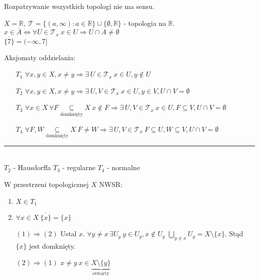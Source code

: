 \vspace{1cm}
Rozpatrywanie wszystkich topologi nie ma sensu.
\begin{prz} 
    $X = \mathbb R, \ \mathcal T = \{ (a,\infty): a \in \mathbb R \} \cup \{\emptyset,\mathbb R\}$ - topologia na $\mathbb R$. \\ 
    $x \in \overline A \Leftrightarrow \forall U \in \mathcal T_x \ x \in U \Rightarrow U \cap A \neq \emptyset$ \\ 
    $\overline{\{7\}} = (-\infty,7]$
\end{prz}
\begin{df} Aksjomaty oddzielania: 
    \begin{itemize} 
        \item[$T_1$] $\forall x,y \in X, x \neq y \Rightarrow \exists \, U \in \mathcal T_x \ x \in U, y \notin U$
        \item[$T_2$] $\forall x,y \in X, x \neq y \Rightarrow \exists \, U,V \in \mathcal T_x 
            \ x \in U, y \in V, U \cap V = \emptyset$
        \item[$T_3$] $\forall x \in X \, \forall F \underset{\text{domknięty}}{\subseteq} X \ x \notin F 
            \Rightarrow \exists \, U, V \in \mathcal T_x \ x \in U, F \subseteq V, U \cap V = \emptyset$
        \item[$T_4$] $\forall F, W \underset{\text{domknięty}}{\subseteq} X \ F \neq W \Rightarrow 
            \exists \, U, V \in \mathcal T_x \ F \subseteq U, W \subseteq V, U \cap V = \emptyset$
    \end{itemize} 
    \noindent \rule{2cm}{0.4pt} \\ 
    \footnotesize{$T_2$ - Hausdorffa
    $T_3$ - regularne 
    $T_4$ - normalne}
    
\end{df} 
\begin{lem} 
    W przestrzeni topologicznej $X$ NWSR: 
    \begin{enumerate}[(1)] 
        \item $X \in T_1$
        \item $\forall x \in X \ \overline{\{x\}} = \{x\}$
    \end{enumerate} 
    \begin{dd} \hfill 
        \begin{itemize} 
            \item[$(1) \Rightarrow (2)$] Ustal $x$. $\forall y \neq x \, \exists U_y \ y \in U_y, x \notin U_y$
                $\bigcup\limits_{y \neq x} U_y = X \setminus \{x\}$. Stąd $\{x\}$ jest domknięty.
            \item[$(2) \Rightarrow (1)$] $x \neq y \ x \in  \underbrace{X \setminus \{y\}}_{\text{otwarty}}$
        \end{itemize} 
    \end{dd}
\end{lem} 
